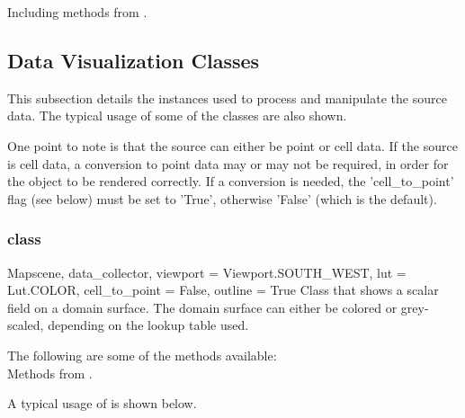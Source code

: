 Including methods from \ActorTwoD. 




\subsection{Data Visualization Classes}
This subsection details the instances used to process and manipulate the source
data. The typical usage of some of the classes are also shown. 

One point to note is that the source can either be point or cell data. If the
source is cell data, a conversion to point data may or may not be
required, in order for the object to be rendered correctly.
If a conversion is needed, the 'cell_to_point' flag (see below) must 
be set to 'True', otherwise 'False' (which is the default).

\subsubsection{\Map class}

\begin{classdesc}{Map}{scene, data_collector, 
viewport = Viewport.SOUTH_WEST, lut = Lut.COLOR, cell_to_point = False,
outline = True}
Class that shows a scalar field on a domain surface. The domain surface 
can either be colored or grey-scaled, depending on the lookup table used.
\end{classdesc}

The following are some of the methods available:\\
Methods from \ActorThreeD.

A typical usage of \Map is shown below.

